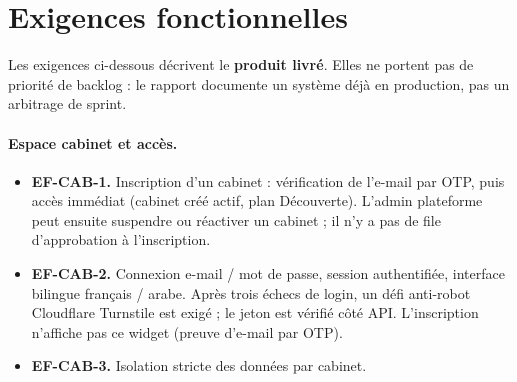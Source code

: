 \section{Exigences fonctionnelles}

Les exigences ci-dessous décrivent le \textbf{produit livré}. Elles ne portent pas de priorité de backlog : le rapport documente un système déjà en production, pas un arbitrage de sprint.

\paragraph{Espace cabinet et accès.}
\begin{itemize}[leftmargin=1.4em]
  \item \textbf{EF-CAB-1.} Inscription d'un cabinet : vérification de l'e-mail par OTP, puis accès immédiat (cabinet créé actif, plan Découverte). L'admin plateforme peut ensuite suspendre ou réactiver un cabinet ; il n'y a pas de file d'approbation à l'inscription.
  \item \textbf{EF-CAB-2.} Connexion e-mail / mot de passe, session authentifiée, interface bilingue français / arabe. Après trois échecs de login, un défi anti-robot Cloudflare Turnstile est exigé ; le jeton est vérifié côté API. L'inscription n'affiche pas ce widget (preuve d'e-mail par OTP).
  \item \textbf{EF-CAB-3.} Isolation stricte des données par cabinet.
\end{itemize}

